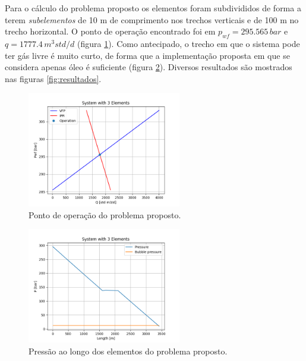 \documentclass[final,3p]{elsarticle}
\numberwithin{equation}{section}
\begin{document}
        Para o cálculo do problema proposto os elementos foram subdivididos de forma a terem \emph{subelementos} de 10 m de comprimento nos trechos verticais e de 100 m no trecho horizontal. O ponto de operação encontrado foi em $p_{wf} = 295.565 \,bar$ e $q = 1777.4 \, m^3 std/d$ (figura \ref{fig:operacao}). Como antecipado, o trecho em que o sistema pode ter gás livre é muito curto, de forma que a implementação proposta em que se considera apenas óleo é suficiente (figura \ref{fig:pressao}). Diversos resultados são mostrados nas figuras \ref{fig:resultados}.

        \begin{figure}
          \centering
          \includegraphics[width=0.6\textwidth]{flow/system1_qp.png}
          \caption{Ponto de operação do problema proposto.}
          \label{fig:operacao}
        \end{figure}

        \begin{figure}
          \centering
          \includegraphics[width=0.6\textwidth]{flow/system1_operation.png}
          \caption{Pressão ao longo dos elementos do problema proposto.}
          \label{fig:pressao}
        \end{figure}
\end{document}
